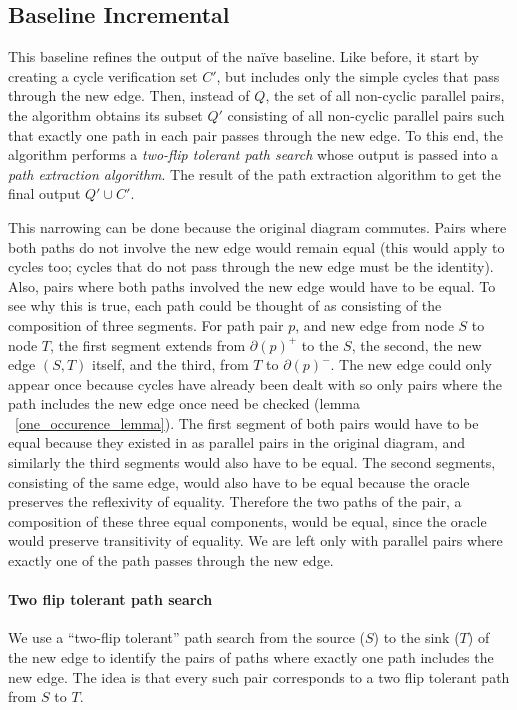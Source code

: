\documentclass[sigplan,review,anonymous]{acmart}
\begin{document}
\subsection{Baseline Incremental}
This baseline refines the output of the na\"{i}ve baseline.
Like before, it start by creating a cycle verification set $C'$, but includes only the simple cycles that pass through the new edge.
Then, instead of $Q$, the set of all non-cyclic parallel pairs, the algorithm obtains its subset $Q'$ consisting of all non-cyclic parallel pairs such that exactly one path in each pair passes through the new edge.
To this end, the algorithm performs a \textit{two-flip tolerant path search} whose output is passed into a \textit{path extraction algorithm}. The result of the path extraction algorithm to get the final output $Q' \cup C'$.

This narrowing can be done because the original diagram commutes.
Pairs where both paths do not involve the new edge would remain equal (this would apply to cycles too; cycles that do not pass through the new edge must be the identity).
Also, pairs where both paths involved the new edge would have to be equal.
To see why this is true, each path could be thought of as consisting of the composition of three segments.
For path pair $p$, and new edge from node $S$ to node $T$, the first segment extends from $\partial(p)^+$ to the $S$, the second, the new edge $(S, T)$ itself, and the third, from $T$ to $\partial(p)^-$.
The new edge could only appear once because cycles have already been dealt with so only pairs where the path includes the new edge once need be checked (lemma ~\ref{one_occurence_lemma}).
The first segment of both pairs would have to be equal because they existed in as parallel pairs in the original diagram, and similarly the third segments would also have to be equal.
The second segments, consisting of the same edge, would also have to be equal because the oracle preserves the reflexivity of equality.
Therefore the two paths of the pair, a composition of these three equal components, would be equal, since the oracle would preserve transitivity of equality.
We are left only with parallel pairs where exactly one of the path passes through the new edge.

\paragraph{Two flip tolerant path search}
We use a ``two-flip tolerant'' path search from the source ($S$) to the sink ($T$) of the new edge to identify the pairs of paths where exactly one path includes the new edge.
The idea is that every such pair corresponds to a two flip tolerant path from $S$ to $T$.
\end{document}
